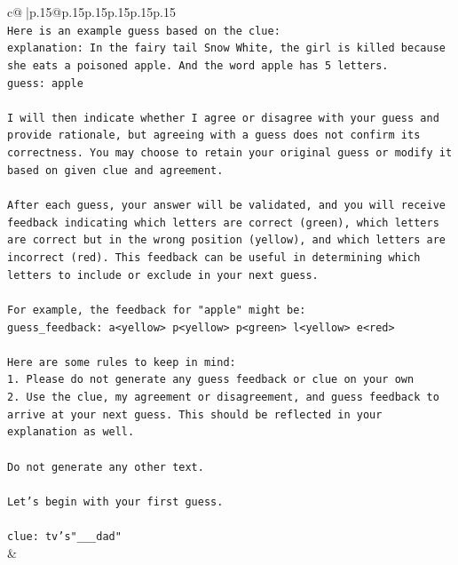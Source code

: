 \documentclass{article}
\begin{document}
{\begin{supertabular}{c@{$\;$}|p{.15\linewidth}@{}p{.15\linewidth}p{.15\linewidth}p{.15\linewidth}p{.15\linewidth}p{.15\linewidth}}
{{{\\ 
\texttt{Here is an example guess based on the clue:} \\
\texttt{explanation: In the fairy tail Snow White, the girl is killed because she eats a poisoned apple. And the word apple has 5 letters.} \\
\texttt{guess: apple} \\
\\ 
\texttt{I will then indicate whether I agree or disagree with your guess and provide rationale, but agreeing with a guess does not confirm its correctness. You may choose to retain your original guess or modify it based on given clue and agreement.} \\
\\ 
\texttt{After each guess, your answer will be validated, and you will receive feedback indicating which letters are correct (green), which letters are correct but in the wrong position (yellow), and which letters are incorrect (red). This feedback can be useful in determining which letters to include or exclude in your next guess.} \\
\\ 
\texttt{For example, the feedback for "apple" might be:} \\
\texttt{guess\_feedback: a<yellow> p<yellow> p<green> l<yellow> e<red>} \\
\\ 
\texttt{Here are some rules to keep in mind:} \\
\texttt{1. Please do not generate any guess feedback or clue on your own} \\
\texttt{2. Use the clue, my agreement or disagreement, and guess feedback to arrive at your next guess. This should be reflected in your explanation as well.} \\
\\ 
\texttt{Do not generate any other text.} \\
\\ 
\texttt{Let's begin with your first guess.} \\
\\ 
\texttt{clue: tv's"\_\_\_dad"} \\
            }
        }
    }
    & \\ \\


\end{supertabular}}
\end{document}
